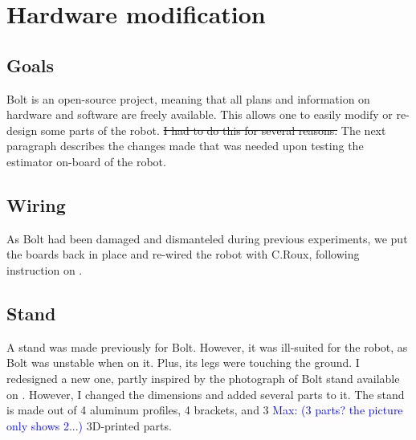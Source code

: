 \documentclass[a4paper,10pt]{article}
\newcommand{\mnaveau}[1]{\textcolor{blue}{Max: #1}}
\begin{document}
\section{Hardware modification}
\subsection{Goals}
Bolt is an open-source project, meaning that all plans and information on hardware and software are freely available. This allows one to easily modify or re-design some parts of the robot.
\st{I had to do this for several reasons.}
The next paragraph describes the changes made that was needed upon testing the estimator on-board of the robot.


\subsection{Wiring}
As Bolt had been damaged and dismanteled during previous experiments, we put the boards back in place and re-wired the robot with C.Roux, following instruction on \cite{2}.

\subsection{Stand}
A stand was made previously for Bolt. However, it was ill-suited for the robot, as Bolt was unstable when on it. Plus, its legs were touching the ground. I redesigned a new one, partly inspired by the photograph of Bolt stand available on \cite{2}. However, I changed the dimensions and added several parts to it. The stand is made out of 4 aluminum profiles, 4 brackets, and 3 \mnaveau{(3 parts? the picture only shows 2...)} 3D-printed parts.
\end{document}
